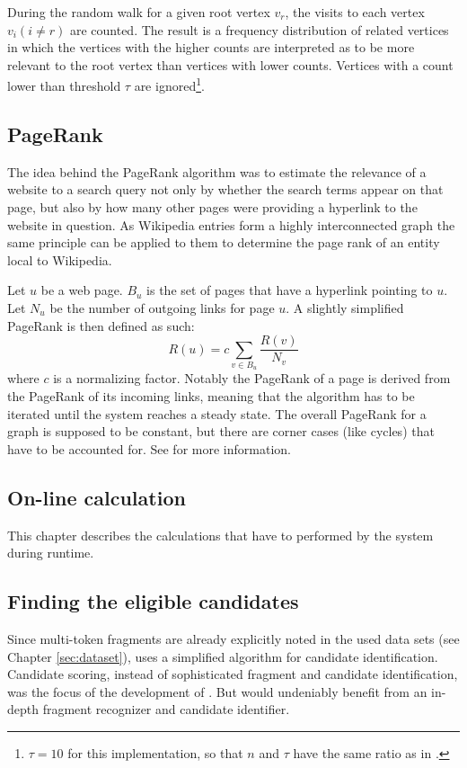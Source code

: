 \documentclass[runningheads,a4paper]{llncs}
\begin{document}
{During the random walk for a given root vertex $v_r$, the visits to each vertex $v_i (i \neq r)$ are counted. The result is a frequency distribution of related vertices in which the vertices with the higher counts are interpreted as to be more relevant to the root vertex than vertices with lower counts. Vertices with a count lower than threshold $\tau$ are ignored\footnote{$\tau = 10$ for this implementation, so that $n$ and $\tau$ have the same ratio as in \cite{Babelfy}.}.

\subsection{PageRank}\label{sec:pagerank}
The idea behind the PageRank algorithm was to estimate the relevance of a website to a search query not only by whether the search terms appear on that page, but also by how many other pages were providing a hyperlink to the website in question. As Wikipedia entries form a highly interconnected graph the same principle can be applied to them to determine the page rank of an entity local to Wikipedia.

Let $u$ be a web page. $B_u$ is the set of pages that have a hyperlink pointing to $u$. Let $N_u$ be the number of outgoing links for page $u$. A slightly simplified PageRank is then defined as such: 
$$R(u) = c \sum_{v \in B_u} \frac{R(v)}{N_v}$$
where $c$ is a normalizing factor. Notably the PageRank of a page is derived from the PageRank of its incoming links, meaning that the algorithm has to be iterated until the system reaches a steady state. The overall PageRank for a graph is supposed to be constant, but there are corner cases (like cycles) that have to be accounted for. See \cite{pageRank} for more information.

\subsection{On-line calculation}

This chapter describes the calculations that have to performed by the system during runtime.

\subsection{Finding the eligible candidates}
Since multi-token fragments are already explicitly noted in the used data sets (see Chapter \ref{sec:dataset}), {\acronym} uses a simplified algorithm for candidate identification. Candidate scoring, instead of sophisticated fragment and candidate identification, was the focus of the development of {\acronym}. But {\acronym} would undeniably benefit from an in-depth fragment recognizer and candidate identifier.

}
\end{document}
